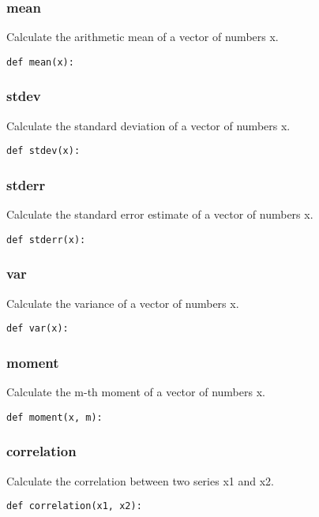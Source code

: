 \documentclass[twoside,11pt]{book}
\begin{document}
\subsubsection*{{\bf mean}}
Calculate the arithmetic mean of a vector of numbers x.  

\begin{lstlisting}
def mean(x):
\end{lstlisting}

\subsubsection*{{\bf stdev}}
Calculate the standard deviation of a vector of numbers x.  

\begin{lstlisting}
def stdev(x):
\end{lstlisting}

\subsubsection*{{\bf stderr}}
Calculate the standard error estimate of a vector of numbers x.  

\begin{lstlisting}
def stderr(x):
\end{lstlisting}

\subsubsection*{{\bf var}}
Calculate the variance of a vector of numbers x.  

\begin{lstlisting}
def var(x):
\end{lstlisting}

\subsubsection*{{\bf moment}}
Calculate the m-th moment of a vector of numbers x.  

\begin{lstlisting}
def moment(x, m):
\end{lstlisting}

\subsubsection*{{\bf correlation}}
Calculate the correlation between two series x1 and x2.  

\begin{lstlisting}
def correlation(x1, x2):
\end{lstlisting}
\end{document}
